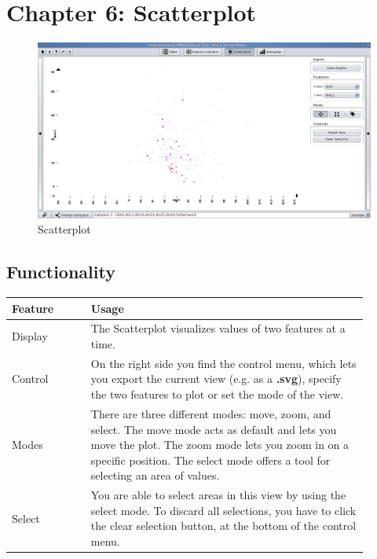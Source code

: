 
\section{\color{fancy}Chapter 6: Scatterplot}

\begin{figure}[h]
  \centering
  \includegraphics[width=16cm]{images/bsv/Scatterplot.png}
  \caption{Scatterplot}
  \label{fig:scatterplot}
\end{figure}

\subsection{Functionality}
\begin{tabular}{p{0.2\linewidth}p{0.7\linewidth}}
  \color{fancy}Feature & \color{fancy}Usage \\ \hline
  Display & The Scatterplot visualizes values of two features at a time. \\ \hline
  Control & On the right side you find the control menu, which lets you export the current view (e.g. as a \textbf{.svg}), specify the two features to plot or set the mode of the view. \\ \hline
  Modes & There are three different modes: move, zoom, and select. The move mode acts as default and lets you move the plot. The zoom mode lets you zoom in on a specific position. The select mode offers a tool for selecting an area of values. \\ \hline
  Select & You are able to select areas in this view by using the select mode. To discard all selections, you have to click the clear selection button, at the bottom of the control menu. \\ \hline
\end{tabular}

